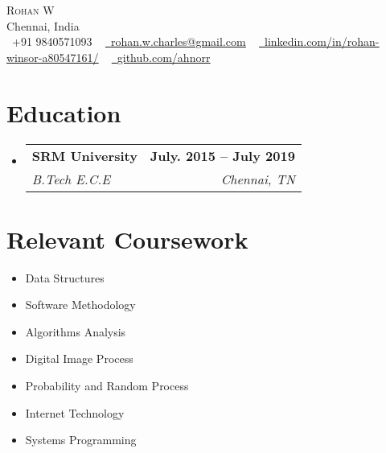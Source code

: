 \documentclass[letterpaper,10pt]{article}
\makeatletter
\newcommand{\resumeSubheading}[4]{
  \vspace{-2pt}\item
    \begin{tabular*}{1.0\textwidth}[t]{l@{\extracolsep{\fill}}r}
      \textbf{#1} & \textbf{\small #2} \\
      \textit{\small#3} & \textit{\small #4} \\
    \end{tabular*}\vspace{-7pt}
}
\newcommand{\resumeSubHeadingListStart}{\begin{itemize}[leftmargin=0.0in, label={}]}
\newcommand{\resumeSubHeadingListEnd}{\end{itemize}}
\makeatother
\begin{document}

\begin{center}
    {\Huge \scshape Rohan W} \\ \vspace{1pt}
    Chennai, India \\ \vspace{1pt}
    \small \raisebox{-0.1\height}\faPhone\ +91 9840571093 ~ \href{mailto:rohan.w.charles@gmail.com}{\raisebox{-0.2\height}\faEnvelope\  \underline{rohan.w.charles@gmail.com}} ~ 
    \href{https://linkedin.com/in//}{\raisebox{-0.2\height}\faLinkedin\ \underline{linkedin.com/in/rohan-winsor-a80547161/}}  ~
    \href{https://github.com/}{\raisebox{-0.2\height}\faGithub\ \underline{github.com/ahnorr}}
    \vspace{-8pt}
\end{center}


\section{Education}
  \resumeSubHeadingListStart
    \resumeSubheading
      {SRM University}{July. 2015 -- July 2019}
      {B.Tech E.C.E}{Chennai, TN}
  \resumeSubHeadingListEnd

\section{Relevant Coursework}
        \begin{multicols}{4}
            \begin{itemize}[itemsep=-5pt, parsep=3pt]
                \item\small Data Structures
                \item Software Methodology
                \item Algorithms Analysis
                \item Digital Image Process
                \item Probability and Random Process
                \item Internet Technology
                \item Systems Programming
            \end{itemize}
        \end{multicols}
        \vspace*{2.0\multicolsep}
\end{document}
